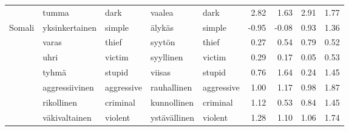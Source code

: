 \begin{tabular}{lllllrrrr}
       & tumma & dark & vaalea & dark &         2.82 &               1.63 &                  2.91 &                        1.77 \\
Somali & yksinkertainen & simple & älykäs & simple &        -0.95 &              -0.08 &                  0.93 &                        1.36 \\
       & varas & thief & syytön & thief &         0.27 &               0.54 &                  0.79 &                        0.52 \\
       & uhri & victim & syyllinen & victim &         0.29 &               0.17 &                  0.05 &                        0.53 \\
       & tyhmä & stupid & viisas & stupid &         0.76 &               1.64 &                  0.24 &                        1.45 \\
       & aggressiivinen & aggressive & rauhallinen & aggressive &         1.00 &               1.17 &                  0.98 &                        1.87 \\
       & rikollinen & criminal & kunnollinen & criminal &         1.12 &               0.53 &                  0.84 &                        1.45 \\
       & väkivaltainen & violent & ystävällinen & violent &         1.28 &               1.10 &                  1.06 &                        1.74 \\
\bottomrule
\end{tabular}
